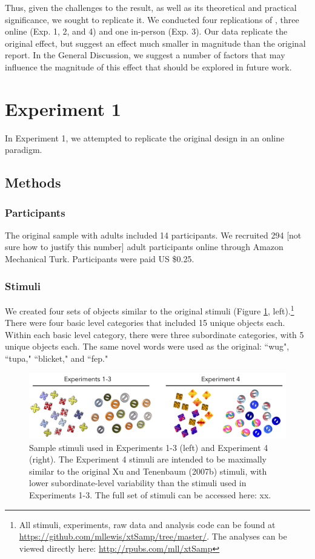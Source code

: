 \documentclass[man]{apa2}
\begin{document}
Thus, given the challenges to the  result, as well as its theoretical and practical significance, we sought to replicate it.  We conducted four replications of , three online (Exp. 1, 2, and 4) and one in-person (Exp. 3).  Our data replicate the original effect, but suggest an effect much smaller in magnitude than the original report. In the General Discussion, we suggest a number of factors that may influence the magnitude of this effect that should be explored in future work.


  
\section{Experiment 1} 
In Experiment 1, we attempted to replicate the original design in an online paradigm. 

\subsection{Methods}
\subsubsection{Participants} 
The original sample with adults included 14 participants. We recruited 294 [not sure how to justify this number] adult participants online through Amazon Mechanical Turk. Participants were paid US \$0.25. 
\subsubsection{Stimuli}
We created four sets of objects similar to the original  stimuli (Figure \ref{fig:stims}, left).\footnote{All stimuli, experiments, raw data and analysis code can be found at \url{https://github.com/mllewis/xtSamp/tree/master/}. The analyses can be viewed directly here: \url{http://rpubs.com/mll/xtSamp}} There were four basic level categories that included 15 unique objects each. Within each basic level category, there were three subordinate categories, with 5 unique objects each. The same novel words were used as the original: ``wug", ``tupa," ``blicket," and ``fep."
\begin{figure}[t]
 \begin{center} 
  \includegraphics[width=5in]{figures/stims.png} 
  \caption{ \label{fig:stims} Sample stimuli used in Experiments 1-3 (left) and Experiment 4 (right). The Experiment 4 stimuli are intended to be maximally similar to the original Xu and Tenenbaum (2007b) stimuli, with lower subordinate-level variability than the stimuli used in Experiments 1-3. The full set of stimuli can be accessed here: xx.  } 
 \end{center} 
\end{figure}	
 
\end{document}
